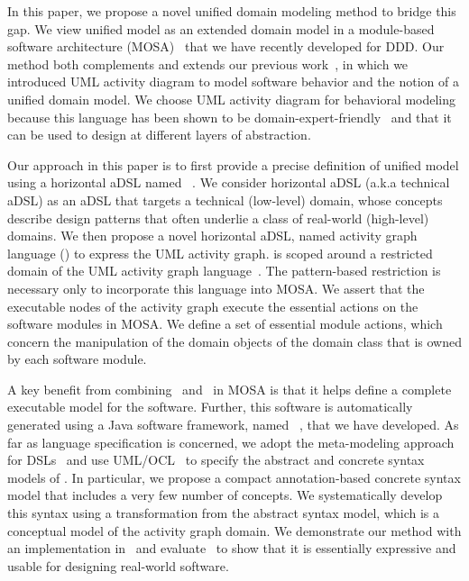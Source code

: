 In this paper, we propose a novel unified domain modeling method to bridge this gap. 
We view unified model as an extended domain model in a module-based software architecture (MOSA)~\cite{le_generative_2018} that we have recently developed for DDD.
Our method both complements and extends our previous work~\cite{le_domain_2018}, in which we introduced UML activity diagram to model software behavior and the notion of a unified domain model.
We choose UML activity diagram for behavioral modeling because this language has been shown to be domain-expert-friendly~\cite{dumas_uml_2001} and that it can be used to design at different layers of abstraction. 

Our approach in this paper is to first provide a precise definition of unified model using a horizontal aDSL named \dcsl~\cite{le_domain_2018}. We consider horizontal aDSL (a.k.a technical aDSL) as an aDSL that targets a technical (low-level) domain, whose concepts describe design patterns that often underlie a class of real-world (high-level) domains. 
%
We then propose a novel horizontal aDSL, named activity graph language (\agl) to express the UML activity graph. \agl is scoped around a restricted domain of the UML activity graph language~\cite{omg_unified_2015}. 
The  pattern-based restriction is necessary only to incorporate this language into MOSA. 
We assert that the executable nodes of the activity graph execute the essential actions on the software modules in MOSA. We define a set of essential module actions, which concern the manipulation of the domain objects of the domain class that is owned by each software module.

A key benefit from combining \dcsl~and \agl~in MOSA is that it helps define a complete executable model for the software. Further, this software is automatically generated using a Java software framework, named \jdomainapp~\cite{le_jdomainapp_2017}, that we have developed.
%
As far as language specification is concerned, we adopt the meta-modeling approach for DSLs~\cite{kleppe_software_2008} and use UML/OCL~\cite{omg_unified_2015, omg_object_2014} to specify the abstract and concrete syntax models of \agl. In particular, we propose a compact annotation-based concrete syntax model that includes a very few number of concepts. We systematically develop this syntax using a transformation from the abstract syntax model, which is a conceptual model of the activity graph domain.
%
We demonstrate our method with an implementation in \jdomainapp~and evaluate \agl~to show that it is essentially expressive and usable for designing real-world software. 

